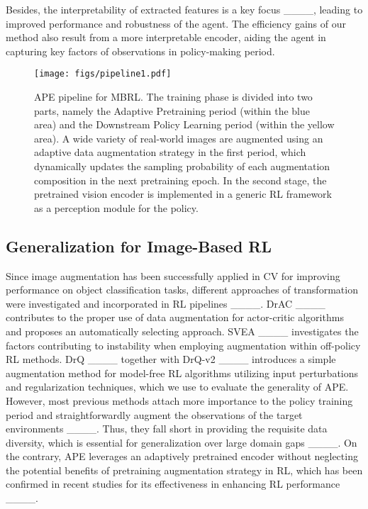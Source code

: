 Besides, the interpretability of extracted features is a key focus ____, leading to improved performance and robustness of the agent. The efficiency gains of our method also result from a more interpretable encoder, aiding the agent in capturing key factors of observations in policy-making period.

\begin{figure*}[t]
\centering
\texttt{[image: figs/pipeline1.pdf]} %
\caption{APE pipeline for MBRL. The training phase is divided into two parts, namely the Adaptive Pretraining period (within the 
blue area) and the Downstream Policy Learning period (within the 
yellow area). A wide variety of real-world images are augmented using an adaptive data augmentation strategy in the first period, which dynamically updates the sampling probability of each augmentation composition in the next pretraining epoch. In the second stage, the pretrained vision encoder is implemented in a generic RL framework as a perception module for the policy.}
\label{fig1}
\end{figure*}

\subsection{Generalization for Image-Based RL}
Since image augmentation has been successfully applied in CV for improving performance on object classification tasks, different approaches of transformation were investigated and incorporated in RL pipelines ____. 
DrAC ____ contributes to the proper use of data augmentation for actor-critic algorithms and proposes an automatically selecting approach. 
SVEA ____ investigates the factors contributing to instability when employing augmentation within off-policy RL methods. DrQ ____ together with DrQ-v2 ____ introduces a simple augmentation method for model-free RL algorithms utilizing input perturbations and regularization techniques, which we use to evaluate the generality of APE.
However, most previous methods attach more importance to the policy training period and straightforwardly augment the observations of the target environments ____. Thus, they fall short in providing the requisite data diversity, which is essential for generalization over large domain gaps ____. 
On the contrary, APE leverages an adaptively pretrained encoder without neglecting the potential benefits of pretraining augmentation strategy in RL, which has been confirmed in recent studies for its effectiveness in enhancing RL performance ____.

